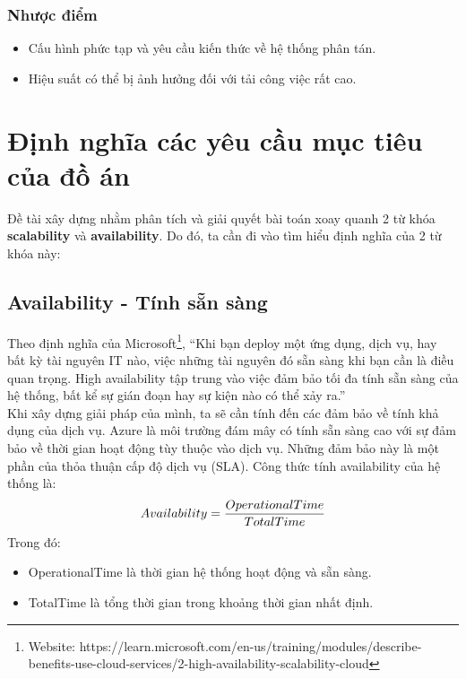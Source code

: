 \subsubsection{Nhược điểm}
\begin{itemize}
    \item Cấu hình phức tạp và yêu cầu kiến thức về hệ thống phân tán.
    \item Hiệu suất có thể bị ảnh hưởng đối với tải công việc rất cao.
\end{itemize}

\section{Định nghĩa các yêu cầu mục tiêu của đồ án}
\noindent Đề tài xây dựng nhằm phân tích và giải quyết bài toán xoay quanh 2 từ khóa \textbf{scalability} và \textbf{availability}. Do đó, ta cần đi vào tìm hiểu định nghĩa của 2 từ khóa này:

\subsection{Availability - Tính sẵn sàng}
\noindent Theo định nghĩa của Microsoft\footnote{Website: https://learn.microsoft.com/en-us/training/modules/describe-benefits-use-cloud-services/2-high-availability-scalability-cloud}, “Khi bạn deploy một ứng dụng, dịch vụ, hay bất kỳ tài nguyên IT nào, việc những tài nguyên đó sẵn sàng khi bạn cần là điều quan trọng. High availability tập trung vào việc đảm bảo tối đa tính sẵn sàng của hệ thống, bất kể sự gián đoạn hay sự kiện nào có thể xảy ra.” \\[0.5cm]
\noindent Khi xây dựng giải pháp của mình, ta sẽ cần tính đến các đảm bảo về tính khả dụng của dịch vụ. Azure là môi trường đám mây có tính sẵn sàng cao với sự đảm bảo về thời gian hoạt động tùy thuộc vào dịch vụ. Những đảm bảo này là một phần của thỏa thuận cấp độ dịch vụ (SLA).
\noindent Công thức tính availability của hệ thống là:\\
\begin{equation}
    Availability = \frac{Operational Time}{Total Time}\\
\end{equation}
\noindent Trong đó:
\begin{itemize}
    \item OperationalTime là thời gian hệ thống hoạt động và sẵn sàng.
    \item TotalTime là tổng thời gian trong khoảng thời gian nhất định.
\end{itemize}
